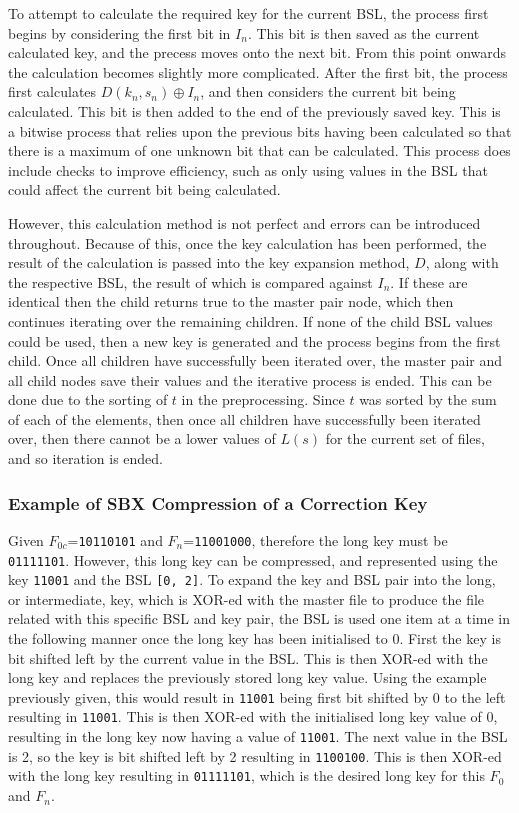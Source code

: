 \documentclass{hehe}
\begin{document}
To attempt to calculate the required key for the current BSL, the process first begins by considering the first bit in $I_n$. This bit is then saved as the current calculated key, and the precess moves onto the next bit. From this point onwards the calculation becomes slightly more complicated. After the first bit, the process first calculates $D(k_n, s_n) \oplus I_n$, and then considers the current bit being calculated. This bit is then added to the end of the previously saved key. This is a bitwise process that relies upon the previous bits having been calculated so that there is a maximum of one unknown bit that can be calculated. This process does include checks to improve efficiency, such as only using values in the BSL that could affect the current bit being calculated.

However, this calculation method is not perfect and errors can be introduced throughout. Because of this, once the key calculation has been performed, the result of the calculation is passed into the key expansion method, $D$, along with the respective BSL, the result of which is compared against $I_n$. If these are identical then the child returns true to the master pair node, which then continues iterating over the remaining children. If none of the child BSL values could be used, then a new key is generated and the process begins from the first child. Once all children have successfully been iterated over, the master pair and all child nodes save their values and the iterative process is ended. This can be done due to the sorting of $t$ in the preprocessing. Since $t$ was sorted by the sum of each of the elements, then once all children have successfully been iterated over, then there cannot be a lower values of $L(s)$ for the current set of files, and so iteration is ended.

\subsubsection{Example of SBX Compression of a Correction Key}

Given $F_{0c}$=\texttt{10110101} and $F_n$=\texttt{11001000}, therefore the long key must be \texttt{01111101}. However, this long key can be compressed, and represented using the key \texttt{11001} and the BSL \texttt{[0, 2]}. To expand the key and BSL pair into the long, or intermediate, key, which is XOR-ed with the master file to produce the file related with this specific BSL and key pair, the BSL is used one item at a time in the following manner once the long key has been initialised to 0. First the key is bit shifted left by the current value in the BSL. This is then XOR-ed with the long key and replaces the previously stored long key value. Using the example previously given, this would result in \texttt{11001} being first bit shifted by 0 to the left resulting in \texttt{11001}. This is then XOR-ed with the initialised long key value of 0, resulting in the long key now having a value of \texttt{11001}. The next value in the BSL is 2, so the key is bit shifted left by 2 resulting in \texttt{1100100}. This is then XOR-ed with the long key resulting in \texttt{01111101}, which is the desired long key for this $F_0$ and $F_n$.
\end{document}
